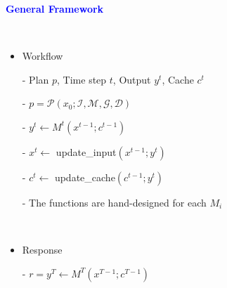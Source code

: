 \documentclass[professionalfont]{beamer}
\begin{document}
\begin{frame}

\begin{center}
    { \textbf{\textcolor{blue}{ {\fontsize{12}{14}\selectfont General Framework} }} }
\end{center}
\\[0.3cm]

\begin{itemize}
    \item Workflow

    - Plan \(p\), Time step \(t\), Output \(y^t\), Cache \(c^t\)

    - \( p = \mathcal{P}(x_0; \mathcal{I}, \mathcal{M}, \mathcal{G}, \mathcal{D}) \)

    - \(y^t \leftarrow M^t(x^{t-1};c^{t-1})\)

    - \(x^t \leftarrow \) update\_input\( (x^{t-1};y^t) \)

    - \(c^t \leftarrow \) update\_cache\( (c^{t-1};y^t) \)

    - The functions are hand-designed for each \(M_i\)

    \\[0.5cm]   

    \item Response

    - \( r=y^T \leftarrow M^T(x^{T-1};c^{T-1}) \)
\end{itemize}

\end{frame}
\end{document}
